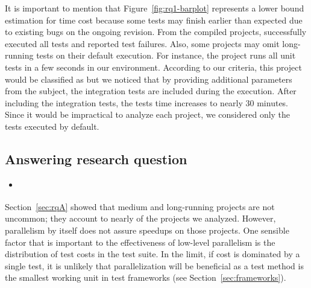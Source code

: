 It is important to mention that Figure~\ref{fig:rq1-barplot}
represents a lower bound estimation for time cost because some tests
may finish earlier than expected due to existing bugs on the ongoing
revision.  From the \numSubjs{} compiled projects, \numSubjsPass{}
successfully executed all tests and \numSubjsFail{} reported test
failures.  Also, some projects may omit long-running tests on their
default execution. For instance, the project
 runs all unit tests in a few seconds in
our environment.  According to our criteria, this project would be
classified as \shortg{} but we noticed that by providing additional
parameters from the subject, the integration tests are included during
the execution.  After including the integration tests, the tests time
increases to nearly 30 minutes.  Since it would be impractical to
analyze each project, we considered only the tests executed by
default.

\begin{center}
\end{center}

\subsection{Answering research question \numRQB{}}
\label{sec:rqB}

\begin{itemize}
    \item \emph{\RQB}
\end{itemize}

Section~\ref{sec:rqA} showed that medium and long-running projects are
not uncommon; they account to nearly \percentMedLongRunning{} of the
\numSubjs{} projects we analyzed.  However, parallelism by itself does
not assure speedups on those projects.  One sensible factor that is
important to the effectiveness of low-level parallelism is the
distribution of test costs in the test suite.  In the limit, if cost
is dominated by a single test, it is unlikely that parallelization
will be beneficial as a test method is the smallest working unit in
test frameworks (see Section~\ref{sec:frameworks}).

